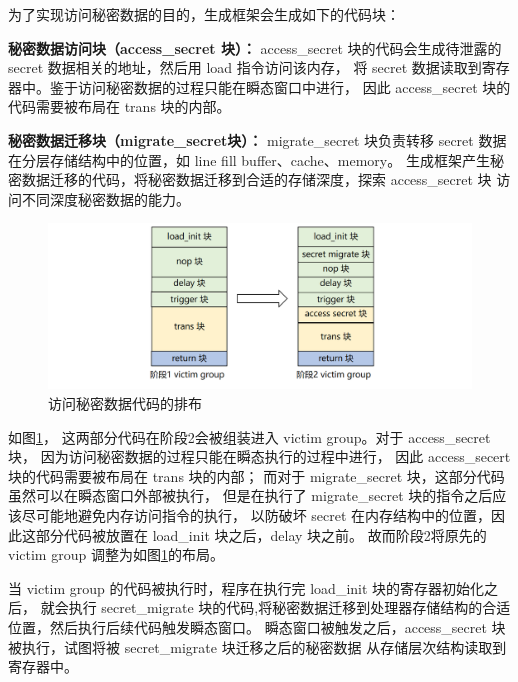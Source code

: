 为了实现访问秘密数据的目的，生成框架会生成如下的代码块：\par

\textbf{秘密数据访问块（access\_secret 块）：}
access\_secret 块的代码会生成待泄露的 secret 数据相关的地址，然后用 load 指令访问该内存，
将 secret 数据读取到寄存器中。鉴于访问秘密数据的过程只能在瞬态窗口中进行，
因此 access\_secret 块的代码需要被布局在 trans 块的内部。\par

\textbf{秘密数据迁移块（migrate\_secret块）：}
migrate\_secret 块负责转移 secret 数据在分层存储结构中的位置，如 line fill buffer、cache、memory。
生成框架产生秘密数据迁移的代码，将秘密数据迁移到合适的存储深度，探索 access\_secret 块
访问不同深度秘密数据的能力。\par

\begin{figure}[!h]
    \centering
    \includegraphics[width=\linewidth]{figure/paper/stage2-access-secret.png}
    \caption{访问秘密数据代码的排布}
    \label{paper:access-secret}
\end{figure}

如图\ref{paper:access-secret}，
这两部分代码在阶段2会被组装进入 victim group。对于 access\_secret 块，
因为访问秘密数据的过程只能在瞬态执行的过程中进行，
因此 access\_secert 块的代码需要被布局在 trans 块的内部；
而对于 migrate\_secret 块，这部分代码虽然可以在瞬态窗口外部被执行，
但是在执行了 migrate\_secret 块的指令之后应该尽可能地避免内存访问指令的执行，
以防破坏 secret 在内存结构中的位置，因此这部分代码被放置在 load\_init 块之后，delay 块之前。
故而阶段2将原先的 victim group 调整为如图\ref{paper:access-secret}的布局。\par

当 victim group 的代码被执行时，程序在执行完 load\_init 块的寄存器初始化之后，
就会执行 secret\_migrate 块的代码,将秘密数据迁移到处理器存储结构的合适位置，然后执行后续代码触发瞬态窗口。
瞬态窗口被触发之后，access\_secret 块被执行，试图将被 secret\_migrate 块迁移之后的秘密数据
从存储层次结构读取到寄存器中。\par

